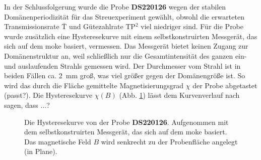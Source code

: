 \noindent
In der Schlussfolgerung wurde die Probe \textbf{DS220126} wegen der stabilen Domänenperiodizität für das Streuexperiment gewählt, obwohl die erwarteten Transmissionsrate $\bar{\text{T}}$ und Gütezahlrate TP$^2$ viel niedriger sind. Für die Probe wurde zusätzlich eine Hysteresekurve mit einem selbstkonstruirten Messgerät, das sich auf dem \gls{moke} basiert, vermessen. Das Messgerät bietet keinen Zugang zur Domänenstruktur an, weil schließlich nur die Gesamtintensität des ganzen ein- und auslaufenden Strahls gemessen wird. Der Durchmesser vom Strahl ist in beiden Fällen ca. \SI{2}{\milli\meter} groß, was viel größer gegen der Domänengröße ist. So wird das durch die Fläche gemittelte Magnetisierungsgrad $\chi$ der Probe abgetastet (passt?). Die Hysteresekurve $\chi(B)$ (Abb. \ref{fig:hysterese_sample}) lässt dem Kurvenverlauf nach sagen, dass ...?
\begin{figure}[H]
    \centering
    
    \caption{Die Hysteresekurve von der Probe \textbf{DS220126}. Aufgenommen mit dem selbstkonstruirten Messgerät, das sich auf dem \gls{moke} basiert. Das magnetische Feld $B$ wird senkrecht zu der Probenfläche angelegt (in Plane).}
    \label{fig:hysterese_sample}
\end{figure}
\newpage